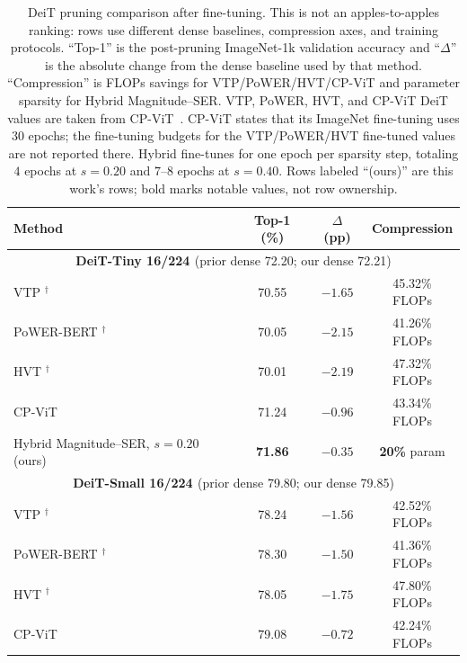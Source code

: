 \documentclass[11pt]{article}
\theoremstyle{plain}
\theoremstyle{definition}
\theoremstyle{remark}
\newcommand{\1}{\mathbf{1}}
\begin{document}
\begin{table}[ht]
\centering
\caption{DeiT pruning comparison after fine-tuning.  This is not an apples-to-apples ranking: rows use different dense baselines, compression axes, and training protocols.  ``Top-1'' is the post-pruning ImageNet-1k validation accuracy and ``\(\Delta\)'' is the absolute change from the dense baseline used by that method.  ``Compression'' is FLOPs savings for VTP/PoWER/HVT/CP-ViT and parameter sparsity for Hybrid Magnitude--SER.  VTP, PoWER, HVT, and CP-ViT DeiT values are taken from CP-ViT~\cite{song2022cp}. CP-ViT states that its ImageNet fine-tuning uses \(30\) epochs; the fine-tuning budgets for the VTP/PoWER/HVT fine-tuned values are not reported there. Hybrid fine-tunes for one epoch per sparsity step, totaling \(4\) epochs at \(s=0.20\) and \(7\)--\(8\) epochs at \(s=0.40\). Rows labeled ``(ours)'' are this work's rows; bold marks notable values, not row ownership.}
\label{tab:deit_prior_comparison}
\scriptsize
\setlength{\tabcolsep}{4pt}
\begin{tabular}{lccc}
\toprule
Method & Top-1 (\%) & \(\Delta\) (pp) & Compression \\
\midrule
\multicolumn{4}{c}{\textbf{DeiT-Tiny 16/224 \cite{touvron2021training}} (prior dense 72.20; our dense 72.21)} \\
VTP \cite{zhu2021visual}$^\dagger$              & 70.55 & \(-1.65\) & 45.32\% FLOPs \\
PoWER-BERT \cite{goyal2020powerbert}$^\dagger$  & 70.05 & \(-2.15\) & 41.26\% FLOPs \\
HVT \cite{pan2021scalable}$^\dagger$            & 70.01 & \(-2.19\) & 47.32\% FLOPs \\
CP-ViT \cite{song2022cp}                        & 71.24 & \(-0.96\) & 43.34\% FLOPs \\
Hybrid Magnitude--SER, \(s=0.20\) (ours) & \textbf{71.86} & \(\boldsymbol{-0.35}\) & \textbf{20\%} param \\
\midrule
\multicolumn{4}{c}{\textbf{DeiT-Small 16/224 \cite{touvron2021training}} (prior dense 79.80; our dense 79.85)} \\
VTP \cite{zhu2021visual}$^\dagger$              & 78.24 & \(-1.56\) & 42.52\% FLOPs \\
PoWER-BERT \cite{goyal2020powerbert}$^\dagger$  & 78.30 & \(-1.50\) & 41.36\% FLOPs \\
HVT \cite{pan2021scalable}$^\dagger$            & 78.05 & \(-1.75\) & 47.80\% FLOPs \\
CP-ViT \cite{song2022cp}                        & 79.08 & \(-0.72\) & 42.24\% FLOPs \\

\end{tabular}
\end{table}
\end{document}
